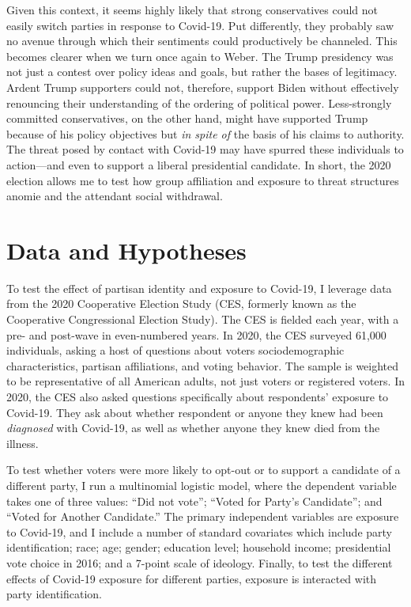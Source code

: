 \documentclass[
  12pt,
]{article}
\begin{document}
Given this context, it seems highly likely that strong conservatives could not easily switch parties in response to Covid-19. Put differently, they probably saw no avenue through which their sentiments could productively be channeled. This becomes clearer when we turn once again to Weber. The Trump presidency was not just a contest over policy ideas and goals, but rather the bases of legitimacy. Ardent Trump supporters could not, therefore, support Biden without effectively renouncing their understanding of the ordering of political power. Less-strongly committed conservatives, on the other hand, might have supported Trump because of his policy objectives but \emph{in spite of} the basis of his claims to authority. The threat posed by contact with Covid-19 may have spurred these individuals to action---and even to support a liberal presidential candidate. In short, the 2020 election allows me to test how group affiliation and exposure to threat structures anomie and the attendant social withdrawal.

\hypertarget{data-and-hypotheses}{%
\section*{Data and Hypotheses}\label{data-and-hypotheses}}

To test the effect of partisan identity and exposure to Covid-19, I leverage data from the 2020 Cooperative Election Study (CES, formerly known as the Cooperative Congressional Election Study). The CES is fielded each year, with a pre- and post-wave in even-numbered years. In 2020, the CES surveyed 61,000 individuals, asking a host of questions about voters sociodemographic characteristics, partisan affiliations, and voting behavior. The sample is weighted to be representative of all American adults, not just voters or registered voters. In 2020, the CES also asked questions specifically about respondents' exposure to Covid-19. They ask about whether respondent or anyone they knew had been \emph{diagnosed} with Covid-19, as well as whether anyone they knew died from the illness.

To test whether voters were more likely to opt-out or to support a candidate of a different party, I run a multinomial logistic model, where the dependent variable takes one of three values: ``Did not vote''; ``Voted for Party's Candidate''; and ``Voted for Another Candidate.'' The primary independent variables are exposure to Covid-19, and I include a number of standard covariates which include party identification; race; age; gender; education level; household income; presidential vote choice in 2016; and a 7-point scale of ideology. Finally, to test the different effects of Covid-19 exposure for different parties, exposure is interacted with party identification.
\end{document}
